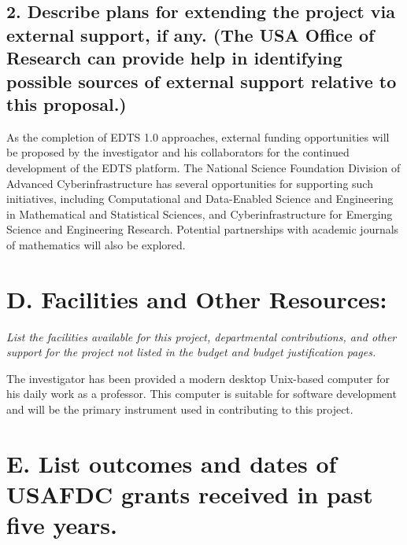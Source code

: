 \documentclass[10pt]{article}
\begin{document}
\subsection*{2.	Describe plans for extending the project via external support, if any. (The USA Office of Research can provide help in identifying possible sources of external support relative to this proposal.)}

As the completion of EDTS 1.0 approaches, external funding opportunities
will be proposed by the investigator and his collaborators for the continued
development of the EDTS platform. The National Science Foundation
Division of Advanced Cyberinfrastructure has several opportunities for
supporting such initiatives, including
Computational and Data-Enabled Science and Engineering in Mathematical and Statistical Sciences, and
Cyberinfrastructure for Emerging Science and Engineering Research.
Potential partnerships with academic journals of mathematics will also be explored.














\section*{D.	Facilities and Other Resources:}

\textit{List the facilities available for this project, departmental contributions, and other support for the project not listed in the budget and budget justification pages.}


The investigator has been provided a modern desktop Unix-based computer
for his daily work as a professor. This computer is suitable for
software development and will be the primary instrument used in contributing
to this project.

















\section*{E.	List outcomes and dates of USAFDC grants received in past five years.}
\end{document}
